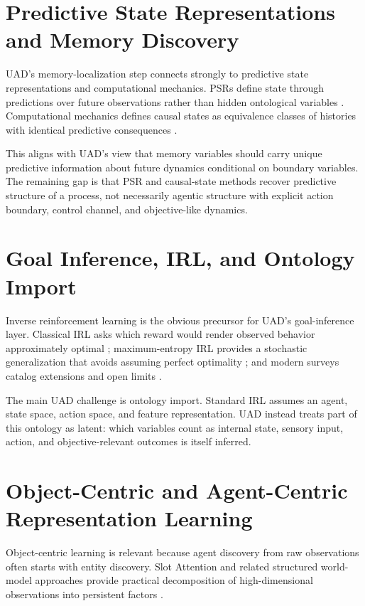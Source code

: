 \documentclass[11pt]{article}
\begin{document}
\section{Predictive State Representations and Memory Discovery}

UAD's memory-localization step connects strongly to predictive state representations and computational mechanics. PSRs define state through predictions over future observations rather than hidden ontological variables \cite{littman2001psr}. Computational mechanics defines causal states as equivalence classes of histories with identical predictive consequences \cite{shalizi2001computational}.

This aligns with UAD's view that memory variables should carry unique predictive information about future dynamics conditional on boundary variables. The remaining gap is that PSR and causal-state methods recover predictive structure of a process, not necessarily agentic structure with explicit action boundary, control channel, and objective-like dynamics.

\section{Goal Inference, IRL, and Ontology Import}

Inverse reinforcement learning is the obvious precursor for UAD's goal-inference layer. Classical IRL asks which reward would render observed behavior approximately optimal \cite{ng2000irl}; maximum-entropy IRL provides a stochastic generalization that avoids assuming perfect optimality \cite{ziebart2008maxent}; and modern surveys catalog extensions and open limits \cite{arora2021survey}.

The main UAD challenge is ontology import. Standard IRL assumes an agent, state space, action space, and feature representation. UAD instead treats part of this ontology as latent: which variables count as internal state, sensory input, action, and objective-relevant outcomes is itself inferred.

\section{Object-Centric and Agent-Centric Representation Learning}

Object-centric learning is relevant because agent discovery from raw observations often starts with entity discovery. Slot Attention and related structured world-model approaches provide practical decomposition of high-dimensional observations into persistent factors \cite{locatello2020slot,kipf2020contrastive,goyal2021rim}.
\end{document}
